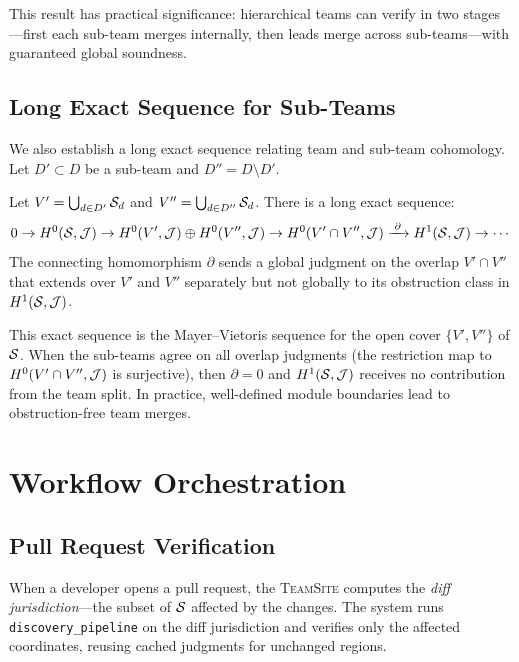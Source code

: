 \documentclass[11pt]{article}
\newcommand{\TeamSite}{\textsc{TeamSite}}
\begin{document}
This result has practical significance: hierarchical teams can
verify in two stages---first each sub-team merges internally, then leads merge
across sub-teams---with guaranteed global soundness.

\subsection{Long Exact Sequence for Sub-Teams}\label{sec:long-exact}

We also establish a long exact sequence relating team and sub-team cohomology.
Let $D' \subset D$ be a sub-team and $D'' = D \setminus D'$.

\begin{proposition}\label{prop:mayer-vietoris}
Let $V' = \bigcup_{d \in D'} \mathcal{S}_d$ and $V'' = \bigcup_{d \in D''} \mathcal{S}_d$.
There is a long exact sequence:
\[
  0 \to H^{0}(\mathcal{S}, \mathcal{J}) \to
  H^{0}(V', \mathcal{J}) \oplus H^{0}(V'', \mathcal{J}) \to
  H^{0}(V' \cap V'', \mathcal{J}) \xrightarrow{\;\partial\;}
  H^{1}(\mathcal{S}, \mathcal{J}) \to \cdots
\]
The connecting homomorphism $\partial$ sends a global judgment on the overlap
$V' \cap V''$ that extends over $V'$ and $V''$ separately but not globally to
its obstruction class in $H^{1}(\mathcal{S}, \mathcal{J})$.
\end{proposition}

This exact sequence is the Mayer--Vietoris sequence for the open cover
$\{V', V''\}$ of $\mathcal{S}$. When the sub-teams agree on all overlap judgments
(\ie the restriction map to $H^{0}(V' \cap V'', \mathcal{J})$ is surjective), then
$\partial = 0$ and $H^{1}(\mathcal{S}, \mathcal{J})$ receives no contribution from the
team split. In practice, well-defined module boundaries lead to
obstruction-free team merges.

\section{Workflow Orchestration}\label{sec:orchestration}

\subsection{Pull Request Verification}

When a developer opens a pull request, the \TeamSite{} computes the
\emph{diff jurisdiction}---the subset of $\mathcal{S}$ affected by the changes.
The system runs \texttt{discovery\_pipeline} on the diff jurisdiction and
verifies only the affected coordinates, reusing cached judgments for
unchanged regions.
\end{document}
